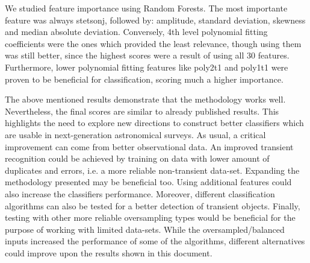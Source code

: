 We studied feature importance using Random Forests. 
The most importante feature was always stetson\textunderscore j, followed by:
amplitude, standard deviation, skewness and median absolute
deviation. 
Conversely, 4th level polynomial fitting coefficients were
the ones which provided the least relevance, though using them was
still better, since the highest scores were a result of using all 30
features. 
Furthermore, lower polynomial fitting features like
poly2\textunderscore t1 and poly1\textunderscore t1 were proven to be
beneficial for classification, scoring much a higher importance. 

The above mentioned results demonstrate that the methodology works well.
Nevertheless, the final scores are similar to already published results.
This highlights the need to explore new directions to construct better
classifiers which are usable in next-generation astronomical surveys.   
As usual, a critical improvement can come from better observational
data.
An improved transient recognition could be achieved by training on
data with lower  amount of duplicates and errors, i.e. a more reliable
non-transient data-set.    
Expanding the methodology presented may be beneficial too. 
Using additional features could also increase the classifiers
performance. 
Moreover, different classification algorithms can also be tested for a
better detection of transient objects.  
Finally, testing with other more reliable oversampling types would be
beneficial for the purpose of working with limited data-sets. 
While the oversampled/balanced inputs increased the performance of some of
the algorithms, different alternatives could improve upon the results
shown in this document. 


